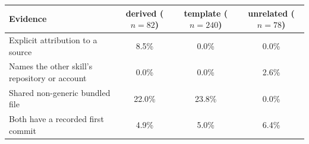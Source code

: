 \begin{tabular}{lccc}
\toprule
Evidence & derived ($n=82$) & template ($n=240$) & unrelated ($n=78$) \\
\midrule
Explicit attribution to a source & 8.5\% & 0.0\% & 0.0\% \\
Names the other skill's repository or account & 0.0\% & 0.0\% & 2.6\% \\
Shared non-generic bundled file & 22.0\% & 23.8\% & 0.0\% \\
\midrule
Both have a recorded first commit & 4.9\% & 5.0\% & 6.4\% \\
\bottomrule
\end{tabular}

